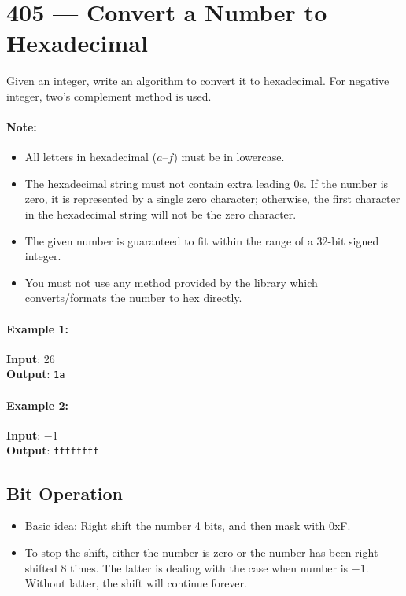 \section{405 --- Convert a Number to Hexadecimal}
Given an integer, write an algorithm to convert it to hexadecimal. For negative integer, two’s complement method is used.

\paragraph{Note:}

\begin{itemize}
\item All letters in hexadecimal ($a$--$f$) must be in lowercase.
\item The hexadecimal string must not contain extra leading 0s. If the number is zero, it is represented by a single zero character; otherwise, the first character in the hexadecimal string will not be the zero character.
\item The given number is guaranteed to fit within the range of a 32-bit signed integer.
\item You must not use any method provided by the library which converts/formats the number to hex directly.
\end{itemize}

\paragraph{Example 1:}

\begin{flushleft}
\textbf{Input}: 26
\\
\textbf{Output}: \texttt{1a}
\end{flushleft}

\paragraph{Example 2:}

\begin{flushleft}
\textbf{Input}: $-1$
\\
\textbf{Output}: \texttt{ffffffff}
\end{flushleft}

\subsection{Bit Operation}
\begin{itemize}
\item Basic idea: Right shift the number 4 bits, and then mask with 0xF. 
\item To stop the shift, either the number is zero or the number has been right shifted 8 times. The latter is dealing with the case when number is $-1$. Without latter, the shift will continue forever.
\end{itemize}

